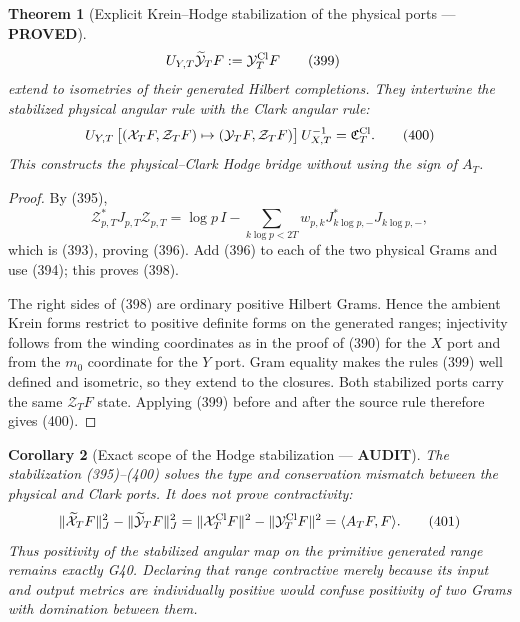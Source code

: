 \documentclass[11pt]{article}
\newtheorem{theorem}{Theorem}
\newtheorem{corollary}[theorem]{Corollary}
\newcommand{\PROVED}{\textcolor{green!45!black}{\textbf{PROVED}}}
\newcommand{\AUDIT}{\textcolor{orange!75!black}{\textbf{AUDIT}}}
\begin{document}
\begin{theorem}[Explicit Krein--Hodge stabilization of the physical ports ---
\PROVED]
\begin{align}
 U_{Y,T}\widetilde{\mathcal Y}_TF&:=\mathcal Y_T^{\rm Cl}F              \tag{399}
\end{align}
extend to isometries of their generated Hilbert completions.  They intertwine
the stabilized physical angular rule with the Clark angular rule:
\begin{equation}
 U_{Y,T}\,
 \bigl[(\mathcal X_TF,\mathcal Z_TF)
       \mapsto(\mathcal Y_TF,\mathcal Z_TF)\bigr]\,
 U_{X,T}^{-1}
 =\mathfrak C_T^{\rm Cl}.                            \tag{400}
\end{equation}
This constructs the physical--Clark Hodge bridge without using the sign of
$A_T$.
\end{theorem}

\begin{proof}
By (395),
\[
 \mathcal Z_{p,T}^*J_{p,T}\mathcal Z_{p,T}
 =\log p\,I-\sum_{k\log p<2T}
        w_{p,k}J_{k\log p,-}^*J_{k\log p,-},
\]
which is (393), proving (396).  Add (396) to each of the two physical Grams
and use (394); this proves (398).

The right sides of (398) are ordinary positive Hilbert Grams.  Hence the
ambient Krein forms restrict to positive definite forms on the generated
ranges; injectivity follows from the winding coordinates as in the proof of
(390) for the $X$ port and from the $m_0$ coordinate for the $Y$ port.
Gram equality makes the rules (399) well defined and isometric, so
they extend to the closures.  Both stabilized ports carry the same
$\mathcal Z_TF$ state.  Applying (399) before and after the source rule
therefore gives (400).
\end{proof}

\begin{corollary}[Exact scope of the Hodge stabilization --- \AUDIT]
The stabilization (395)--(400) solves the type and conservation mismatch
between the physical and Clark ports.  It does not prove contractivity:
\begin{equation}
 \|\widetilde{\mathcal X}_TF\|_{J}^2
 -\|\widetilde{\mathcal Y}_TF\|_{J}^2
 =\|\mathcal X_T^{\rm Cl}F\|^2
 -\|\mathcal Y_T^{\rm Cl}F\|^2
 =\langle A_TF,F\rangle.                            \tag{401}
\end{equation}
Thus positivity of the stabilized angular map on the primitive generated
range remains exactly G40.  Declaring that range contractive merely because
its input and output metrics are individually positive would confuse
positivity of two Grams with domination between them.
\end{corollary}
\end{document}
